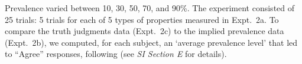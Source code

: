 \documentclass[10pt,letterpaper]{article}
\begin{document}
Prevalence varied between 10, 30, 50, 70, and 90\%.
The experiment consisted of 25 trials: 5 trials for each of 5 types of properties measured in Expt.~2a. %
To compare the truth judgments data (Expt.~2c) to the implied prevalence data (Expt.~2b), we computed, for each subject, an `average prevalence level' that led to ``Agree'' responses, following \cite{Cimpian2010} (see {\it SI Section E} for details).
%
\end{document}
